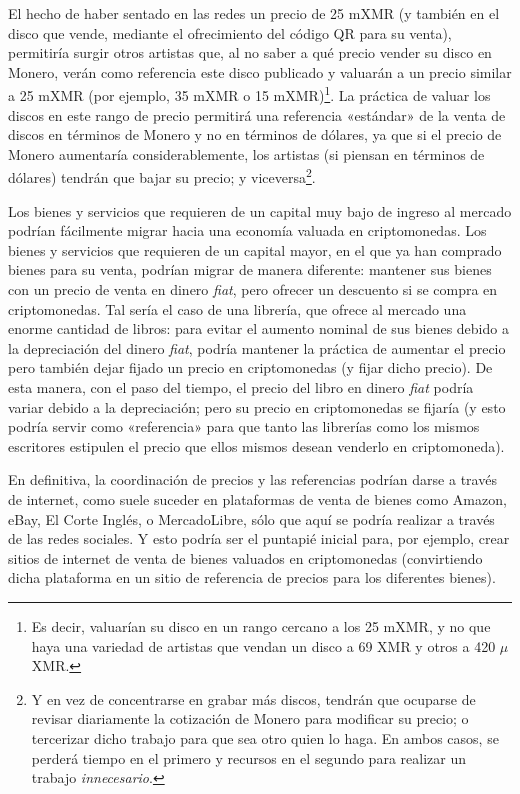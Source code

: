 \documentclass[12pt,a4paper,twoside]{book}
\begin{document}
El hecho de haber sentado en las redes un precio de 25 mXMR (y también en el disco que vende, mediante el ofrecimiento del código QR para su venta), permitiría surgir otros artistas que, al no saber a qué precio vender su disco en Monero, verán como referencia este disco publicado y valuarán a un precio similar a 25 mXMR (por ejemplo, 35 mXMR o 15 mXMR)\footnote{Es decir, valuarían su disco en un rango cercano a los 25 mXMR, y no que haya una variedad de artistas que vendan un disco a 69 XMR y otros a 420 $ \mu $ XMR.}. La práctica de valuar los discos en este rango de precio permitirá una referencia «estándar» de la venta de discos en términos de Monero y no en términos de dólares, ya que si el precio de Monero aumentaría considerablemente, los artistas (si piensan en términos de dólares) tendrán que bajar su precio; y viceversa\footnote{Y en vez de concentrarse en grabar más discos, tendrán que ocuparse de revisar diariamente la cotización de Monero para modificar su precio; o tercerizar dicho trabajo para que sea otro quien lo haga. En ambos casos, se perderá tiempo en el primero y recursos en el segundo para realizar un trabajo \textit{innecesario}.}.

Los bienes y servicios que requieren de un capital muy bajo de ingreso al mercado podrían fácilmente migrar hacia una economía valuada en criptomonedas. Los bienes y servicios que requieren de un capital mayor, en el que ya han comprado bienes para su venta, podrían migrar de manera diferente: mantener sus bienes con un precio de venta en dinero \textit{fiat}, pero ofrecer un descuento si se compra en criptomonedas. Tal sería el caso de una librería, que ofrece al mercado una enorme cantidad de libros: para evitar el aumento nominal de sus bienes debido a la depreciación del dinero \textit{fiat}, podría mantener la práctica de aumentar el precio pero también dejar fijado un precio en criptomonedas (y fijar dicho precio). De esta manera, con el paso del tiempo, el precio del libro en dinero \textit{fiat} podría variar debido a la depreciación; pero su precio en criptomonedas se fijaría (y esto podría servir como «referencia» para que tanto las librerías como los mismos escritores estipulen el precio que ellos mismos desean venderlo en criptomoneda).

En definitiva, la coordinación de precios y las referencias podrían darse a través de internet, como suele suceder en plataformas de venta de bienes como Amazon, eBay, El Corte Inglés, o MercadoLibre, sólo que aquí se podría realizar a través de las redes sociales. Y esto podría ser el puntapié inicial para, por ejemplo, crear sitios de internet de venta de bienes valuados en criptomonedas (convirtiendo dicha plataforma en un sitio de referencia de precios para los diferentes bienes).
\end{document}
